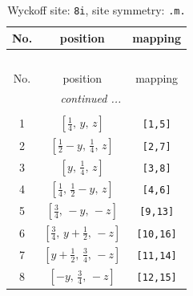 \documentclass[fleqn,8pt]{jsarticle}
\begin{document}
\begin{longtable}{ccc}
\caption{Wyckoff site: {\tt 8i}, site symmetry: {\tt .m.}}
 \\
 \hline \hline
No. & position & mapping \\ \hline \endfirsthead

\multicolumn{2}{l}{\tablename\ \thetable{}} \\
 \hline \hline
No. & position & mapping \\ \hline \endhead

 \hline \hline
\multicolumn{2}{r}{\footnotesize\it continued ...} \\ \endfoot

 \hline \hline
\multicolumn{2}{r}{} \\ \endlastfoot

1 & $\left[ \frac{1}{4},\, y,\, z \right]$ & {\tt [1,5]} \\ \hline
2 & $\left[ \frac{1}{2} - y,\, \frac{1}{4},\, z \right]$ & {\tt [2,7]} \\ \hline
3 & $\left[ y,\, \frac{1}{4},\, z \right]$ & {\tt [3,8]} \\ \hline
4 & $\left[ \frac{1}{4},\, \frac{1}{2} - y,\, z \right]$ & {\tt [4,6]} \\ \hline
5 & $\left[ \frac{3}{4},\, - y,\, - z \right]$ & {\tt [9,13]} \\ \hline
6 & $\left[ \frac{3}{4},\, y + \frac{1}{2},\, - z \right]$ & {\tt [10,16]} \\ \hline
7 & $\left[ y + \frac{1}{2},\, \frac{3}{4},\, - z \right]$ & {\tt [11,14]} \\ \hline
8 & $\left[ - y,\, \frac{3}{4},\, - z \right]$ & {\tt [12,15]} \\
\end{longtable}
\renewcommand{\arraystretch}{1.2}
\end{document}
